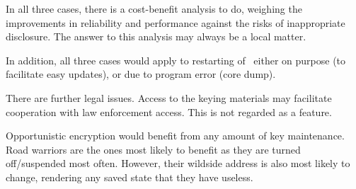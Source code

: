 In all three cases, there is a cost-benefit analysis to do, weighing the
improvements in reliability and performance against the risks of
inappropriate disclosure. The answer to this analysis may always be a local
matter. 

In addition, all three cases would apply to restarting of \pluto\ either on
purpose (to facilitate easy updates), or due to program error (core dump).

There are further legal issues. Access to the keying materials may facilitate 
cooperation with law enforcement access. This is not regarded as a feature.

Opportunistic encryption would benefit from any amount of key maintenance.
Road warriors are the ones most likely to benefit as they are turned
off/suspended most often. However, their wildside address is also most likely 
to change, rendering any saved state that they have useless.
